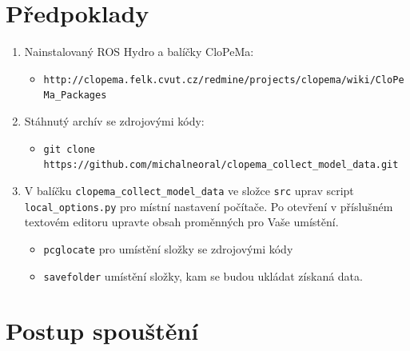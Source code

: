 \documentclass[10pt,a4paper,titlepage,oneside]{report}
\begin{document}
\section{Předpoklady}
\label{sec:prd}
\begin{enumerate}

   \item Nainstalovaný ROS Hydro a balíčky CloPeMa:
  \begin{itemize} 
  
  	\item \verb|http://clopema.felk.cvut.cz/redmine/projects/clopema/wiki/CloPeMa_Packages|
  \end{itemize}
  
  \item Stáhnutý archív se zdrojovými kódy:
  \begin{itemize}
  	\item \verb|git clone https://github.com/michalneoral/clopema_collect_model_data.git|
  \end{itemize}
  
  \item V balíčku \verb|clopema_collect_model_data| ve složce \verb|src| uprav script \verb|local_options.py| pro místní nastavení počítače. Po otevření v příslušném textovém editoru upravte obsah proměnných pro Vaše umístění. 
  \begin{itemize}
  	\item \verb|pcglocate| pro umístění složky se zdrojovými kódy
  	\item \verb|savefolder| umístění složky, kam se budou ukládat získaná data.
  \end{itemize}
\end{enumerate}


\section{Postup spouštění}
\label{sec:runScript}
\end{document}
